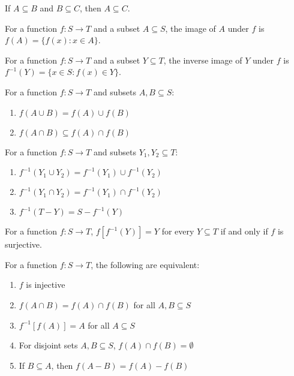 \begin{theorem}
If $A \subseteq B$ and $B \subseteq C$, then $A \subseteq C$.
\end{theorem}

\begin{definition}[Image]
For a function $f: S \to T$ and a subset $A \subseteq S$, the image of $A$ under $f$ is $f(A) = \{f(x) : x \in A\}$.
\end{definition}

\begin{definition}
For a function $f: S \to T$ and a subset $Y \subseteq T$, the inverse image of $Y$ under $f$ is $f^{-1}(Y) = \{x \in S : f(x) \in Y\}$.
\end{definition}



\begin{theorem}
For a function $f: S \to T$ and subsets $A, B \subseteq S$:
\begin{enumerate}
\item $f(A \cup B) = f(A) \cup f(B)$
\item $f(A \cap B) \subseteq f(A) \cap f(B)$
\end{enumerate}
\end{theorem}

\begin{theorem}
For a function $f: S \to T$ and subsets $Y_1, Y_2 \subseteq T$:
\begin{enumerate}
\item $f^{-1}(Y_1 \cup Y_2) = f^{-1}(Y_1) \cup f^{-1}(Y_2)$
\item $f^{-1}(Y_1 \cap Y_2) = f^{-1}(Y_1) \cap f^{-1}(Y_2)$
\item $f^{-1}(T - Y) = S - f^{-1}(Y)$
\end{enumerate}
\end{theorem}

\begin{theorem}
For a function $f: S \to T$, $f[f^{-1}(Y)] = Y$ for every $Y \subseteq T$ if and only if $f$ is surjective.
\end{theorem}

\begin{theorem}
For a function $f: S \to T$, the following are equivalent:
\begin{enumerate}
\item $f$ is injective
\item $f(A \cap B) = f(A) \cap f(B)$ for all $A, B \subseteq S$
\item $f^{-1}[f(A)] = A$ for all $A \subseteq S$
\item For disjoint sets $A, B \subseteq S$, $f(A) \cap f(B) = \emptyset$
\item If $B \subseteq A$, then $f(A - B) = f(A) - f(B)$
\end{enumerate}
\end{theorem}



